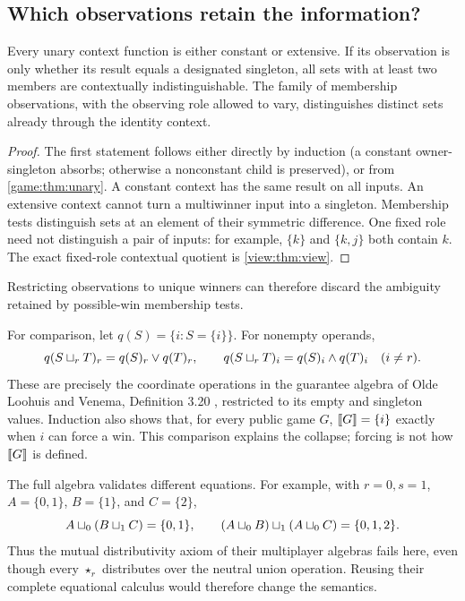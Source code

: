 \subsection{Which observations retain the information?}

\begin{proposition}\label{game:prop:obs}
Every unary context function is either constant or extensive. If its
observation is only whether its result equals a designated singleton,
all sets with at least two members are contextually indistinguishable.
The family of membership observations, with the observing role allowed
to vary, distinguishes distinct sets already through the identity context.
\end{proposition}
\begin{proof}
The first statement follows either directly by induction (a constant
owner-singleton absorbs; otherwise a nonconstant child is preserved), or
from \cref{game:thm:unary}. A constant context has the same result on all
inputs. An extensive context cannot turn a multiwinner input into a
singleton. Membership tests distinguish sets at an element of their
symmetric difference. One fixed role need not distinguish a pair of inputs: for example, $\{k\}$
and $\{k,j\}$ both contain $k$.
The exact fixed-role contextual quotient is \cref{view:thm:view}.
\end{proof}

Restricting observations to unique
winners can therefore discard the ambiguity retained by possible-win
membership tests.

For comparison, let $q(S)=\{i:S=\{i\}\}$. For nonempty operands,
\[
 q(S\mathbin{\sqcup_{r}} T)_r=q(S)_r\lor q(T)_r,\qquad
 q(S\mathbin{\sqcup_{r}} T)_i=q(S)_i\land q(T)_i\quad(i\ne r).
\]
These are precisely the coordinate operations in the guarantee algebra
of Olde Loohuis and Venema, Definition 3.20
\cite{OldeLoohuisVenema2010}, restricted to its empty and singleton
values. Induction also shows that, for every public game $G$, $\llbracket G\rrbracket=\{i\}$
exactly when $i$ can force a win. This comparison explains the
collapse; forcing is not how $\llbracket G\rrbracket$ is defined.

The full algebra validates different equations. For example, with
$r=0,s=1$, $A=\{0,1\}$, $B=\{1\}$, and $C=\{2\}$,
\[
 A\mathbin{\sqcup_{0}}(B\mathbin{\sqcup_{1}} C)=\{0,1\},\qquad
 (A\mathbin{\sqcup_{0}} B)\mathbin{\sqcup_{1}}(A\mathbin{\sqcup_{0}} C)=\{0,1,2\}.
\]
Thus the mutual distributivity axiom of their multiplayer algebras
fails here, even though every $\star_r$ distributes over the neutral
union operation. Reusing their complete equational calculus would
therefore change the semantics.

